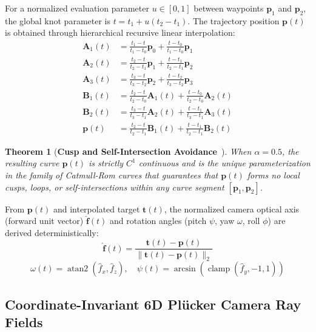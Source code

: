 \documentclass[10pt,twocolumn,letterpaper]{article}
\newtheorem{theorem}{Theorem}
\begin{document}
For a normalized evaluation parameter $u \in [0, 1]$ between waypoints $\mathbf{p}_1$ and $\mathbf{p}_2$, the global knot parameter is $t = t_1 + u(t_2 - t_1)$. The trajectory position $\mathbf{p}(t)$ is obtained through hierarchical recursive linear interpolation:
\begin{align}
\mathbf{A}_1(t) &= \frac{t_1 - t}{t_1 - t_0}\mathbf{p}_0 + \frac{t - t_0}{t_1 - t_0}\mathbf{p}_1 \\
\mathbf{A}_2(t) &= \frac{t_2 - t}{t_2 - t_1}\mathbf{p}_1 + \frac{t - t_1}{t_2 - t_1}\mathbf{p}_2 \\
\mathbf{A}_3(t) &= \frac{t_3 - t}{t_3 - t_2}\mathbf{p}_2 + \frac{t - t_2}{t_3 - t_2}\mathbf{p}_3 \\
\mathbf{B}_1(t) &= \frac{t_2 - t}{t_2 - t_0}\mathbf{A}_1(t) + \frac{t - t_0}{t_2 - t_0}\mathbf{A}_2(t) \\
\mathbf{B}_2(t) &= \frac{t_3 - t}{t_3 - t_1}\mathbf{A}_2(t) + \frac{t - t_1}{t_3 - t_1}\mathbf{A}_3(t) \\
\mathbf{p}(t) &= \frac{t_2 - t}{t_2 - t_1}\mathbf{B}_1(t) + \frac{t - t_1}{t_2 - t_1}\mathbf{B}_2(t)
\end{align}

\begin{theorem}[\textbf{Cusp and Self-Intersection Avoidance}~\cite{yuksel2011parameterization}]
When $\alpha = 0.5$, the resulting curve $\mathbf{p}(t)$ is strictly $C^1$ continuous and is the unique parameterization in the family of Catmull-Rom curves that guarantees that $\mathbf{p}(t)$ forms no local cusps, loops, or self-intersections within any curve segment $[\mathbf{p}_1, \mathbf{p}_2]$.
\end{theorem}

From $\mathbf{p}(t)$ and interpolated target $\mathbf{t}(t)$, the normalized camera optical axis (forward unit vector) $\hat{\mathbf{f}}(t)$ and rotation angles (pitch $\psi$, yaw $\omega$, roll $\phi$) are derived deterministically:
\begin{equation}
\hat{\mathbf{f}}(t) = \frac{\mathbf{t}(t) - \mathbf{p}(t)}{\|\mathbf{t}(t) - \mathbf{p}(t)\|_2}
\end{equation}
\begin{equation}
\omega(t) = \operatorname{atan2}(\hat{f}_x, \hat{f}_z), \quad \psi(t) = \arcsin\left(\operatorname{clamp}(\hat{f}_y, -1, 1)\right)
\end{equation}

\subsection{Coordinate-Invariant 6D Pl\"ucker Camera Ray Fields}
\end{document}
